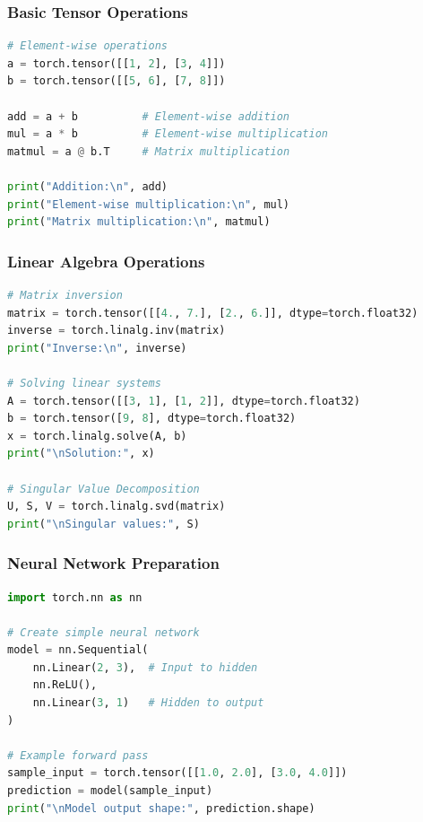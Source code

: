 \documentclass[12pt]{article}
\begin{document}
\subsubsection{Basic Tensor Operations}
\begin{lstlisting}[numbers=none,language=Python, caption=Tensor Computations]
# Element-wise operations
a = torch.tensor([[1, 2], [3, 4]])
b = torch.tensor([[5, 6], [7, 8]])

add = a + b          # Element-wise addition
mul = a * b          # Element-wise multiplication
matmul = a @ b.T     # Matrix multiplication

print("Addition:\n", add)
print("Element-wise multiplication:\n", mul)
print("Matrix multiplication:\n", matmul)
\end{lstlisting}

\subsubsection{Linear Algebra Operations}
\begin{lstlisting}[numbers=none,language=Python, caption=Advanced Operations]
# Matrix inversion
matrix = torch.tensor([[4., 7.], [2., 6.]], dtype=torch.float32)
inverse = torch.linalg.inv(matrix)
print("Inverse:\n", inverse)

# Solving linear systems
A = torch.tensor([[3, 1], [1, 2]], dtype=torch.float32)
b = torch.tensor([9, 8], dtype=torch.float32)
x = torch.linalg.solve(A, b)
print("\nSolution:", x)

# Singular Value Decomposition
U, S, V = torch.linalg.svd(matrix)
print("\nSingular values:", S)
\end{lstlisting}

\subsubsection{Neural Network Preparation}
\begin{lstlisting}[numbers=none,language=Python, caption=Network Fundamentals]
import torch.nn as nn

# Create simple neural network
model = nn.Sequential(
    nn.Linear(2, 3),  # Input to hidden
    nn.ReLU(),
    nn.Linear(3, 1)   # Hidden to output
)

# Example forward pass
sample_input = torch.tensor([[1.0, 2.0], [3.0, 4.0]])
prediction = model(sample_input)
print("\nModel output shape:", prediction.shape)
\end{lstlisting}
\end{document}
